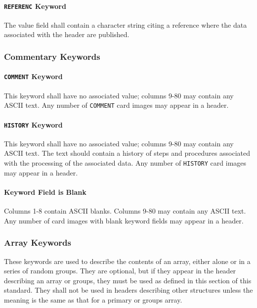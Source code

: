  \paragraph{{\tt REFERENC} Keyword}
 The value field shall contain a character 
 string
 citing a reference where the data associated with the
 header are published.
  
 \subsubsection{Commentary Keywords}
  \label{s:comk}
  
 \paragraph{{\tt COMMENT} Keyword}
  This
  keyword shall have no associated value;
 columns 9-80 may contain any ASCII text. 
 Any number of {\tt COMMENT} card images may appear in a header.
  
 \paragraph{{\tt HISTORY} Keyword}
 This keyword shall have no associated value;
 columns 9-80 may contain any ASCII text. 
  The text should
 contain a history of steps and procedures associated
 with the processing of the associated data.
 Any number of {\tt HISTORY} card images may appear in a header.
  
 \paragraph{Keyword Field is Blank}
 Columns 1-8 contain ASCII blanks. Columns 9-80 may contain any 
 ASCII text. 
 Any number of card images with blank keyword fields 
 may appear in a header.

   \subsubsection{Array Keywords}
   \label{s:array}
   These keywords are used to describe the contents of an
   array, either alone or in a series of
   random groups.
   They are optional, but if they appear in the header describing 
   an array or groups, they must be used as defined in this
   section of this standard. They shall not be used in headers
   describing other structures unless the meaning is the same
   as that for a primary or groups array.
  
